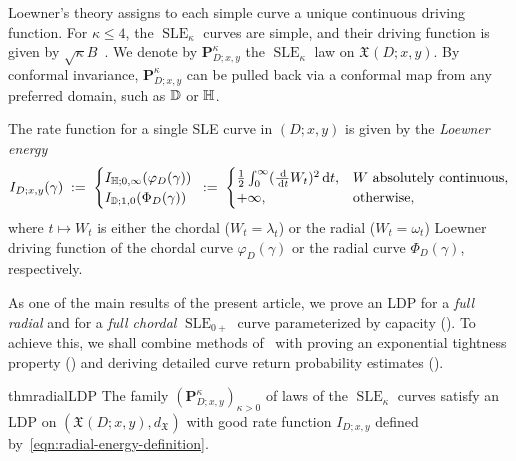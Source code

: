 \documentclass[a4paper, 11pt]{article}
\theoremstyle{definition}
\numberwithin{equation}{section}
\numberwithin{figure}{section}
\newcommand{\SLE}[1][]{\operatorname{SLE}_{#1}}
\newcommand{\lenergy}[2]{I_{#1;#2}}
\newcommand{\Xpaths}[1][]{\mathfrak{X}_{#1}}
\newcommand{\dXpaths}[1][]{d_{\Xpaths[#1]}}
\newcommand{\SLEmeasure}[2]{\mathbf{P}^{#2}_{\!\!#1}}
\begin{document}
Loewner's theory assigns to each simple curve a unique continuous driving function.
For $\kappa \leq 4$, the $\SLE[\kappa]$ curves are simple, 
and their driving function is given by $\sqrt\kappa B$~\cite{Rohde-Schramm:Basic_properties_of_SLE}.
We denote by $\SLEmeasure{D;x,y}{\kappa}$ the $\SLE[\kappa]$ law on $\Xpaths(D; x, y)$.
By conformal invariance, $\SLEmeasure{D;x,y}{\kappa}$ 
can be pulled back via a conformal map from any preferred domain, such as $\mathbb{D}$ or $\mathbb{H}$.

The rate function for a single SLE curve in $(D; x, y)$ is given by the \emph{Loewner energy}
\begin{align}\label{eqn:radial-energy-definition}
\lenergy{D}{x,y}(\gamma) 
\; := \;
\begin{cases}
\lenergy{\bH}{0, \infty}(\varphi_D(\gamma))  \\
\lenergy{\bD}{1, 0}(\Phi_D(\gamma))
\end{cases}
\hspace*{-2mm} := \; 
\begin{cases}
\frac{1}{2}\int_0^\infty (\frac{\ud}{\ud t} W_t)^2 \ud t, & W \textnormal{ absolutely continuous},\\
+ \infty , & \textnormal{otherwise},
\end{cases}
\end{align}
where $t \mapsto W_t$ is either the chordal ($W_t = \lambda_t$) or the radial ($W_t = \omega_t$) Loewner driving function of
the chordal curve $\varphi_D(\gamma)$ or the radial curve $\Phi_D(\gamma)$, respectively.


As one of the main results of the present article, 
we prove an LDP for a \emph{full radial} and for a \emph{full chordal} $\SLE[0+]$ curve parameterized by capacity ().
To achieve this, we shall combine methods of~\cite{Guskov:LPD_for_SLE_in_the_uniform_topology, Peltola-Wang:LDP} 
with proving an exponential tightness property () 
and deriving detailed curve return probability estimates ().



\begin{restatable}{thm}{radialLDP} \label{thm:radial-LDP}
The family $(\SLEmeasure{D;x,y}{\kappa})_{\kappa > 0}$ of laws of the $\SLE[\kappa]$ curves 
satisfy an LDP on $(\Xpaths(D;x,y),\dXpaths)$ 
with good rate function $\lenergy{D}{x,y}$ defined by~\eqref{eqn:radial-energy-definition}. 
\end{restatable}
\end{document}
